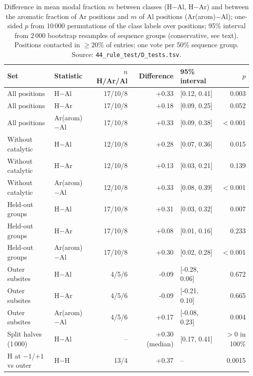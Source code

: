\begin{table}[h]
\centering\small
\caption{Difference in mean modal fraction $m$ between classes (H$-$Al, H$-$Ar) and between the aromatic fraction of Ar positions and $m$ of Al positions (Ar(arom)$-$Al); one-sided $p$ from 10\,000 permutations of the class labels over positions; 95\% interval from 2\,000 bootstrap resamples of sequence groups (conservative, see text). Positions contacted in $\ge$20\% of entries; one vote per 50\% sequence group. Source: \texttt{44\_rule\_test/D\_tests.tsv}.}
\label{tab:tests}
\begin{tabular}{llrrlr}
\toprule
Set & Statistic & $n$ H/Ar/Al & Difference & 95\% interval & $p$\\
\midrule
All positions & H$-$Al & 17/10/8 & +0.33 & [0.12, 0.41] & 0.003\\
All positions & H$-$Ar & 17/10/8 & +0.18 & [0.09, 0.25] & 0.052\\
All positions & Ar(arom)$-$Al & 17/10/8 & +0.33 & [0.09, 0.38] & $<$0.001\\
\addlinespace
Without catalytic & H$-$Al & 12/10/8 & +0.28 & [0.07, 0.36] & 0.015\\
Without catalytic & H$-$Ar & 12/10/8 & +0.13 & [0.03, 0.21] & 0.139\\
Without catalytic & Ar(arom)$-$Al & 12/10/8 & +0.33 & [0.08, 0.39] & $<$0.001\\
\addlinespace
Held-out groups & H$-$Al & 17/10/8 & +0.31 & [0.03, 0.32] & 0.007\\
Held-out groups & H$-$Ar & 17/10/8 & +0.08 & [0.01, 0.16] & 0.233\\
Held-out groups & Ar(arom)$-$Al & 17/10/8 & +0.30 & [0.02, 0.28] & $<$0.001\\
\addlinespace
Outer subsites & H$-$Al & 4/5/6 & -0.09 & [-0.28, 0.06] & 0.672\\
Outer subsites & H$-$Ar & 4/5/6 & -0.09 & [-0.21, 0.10] & 0.665\\
Outer subsites & Ar(arom)$-$Al & 4/5/6 & +0.17 & [-0.08, 0.23] & 0.004\\
\addlinespace
Split halves (1\,000) & H$-$Al & -- & +0.30 (median) & [0.17, 0.41] & $>$0 in 100\%\\
H at $-1$/$+1$ vs outer & H$-$H & 13/4 & +0.37 & -- & 0.0015\\
\bottomrule
\end{tabular}
\end{table}
